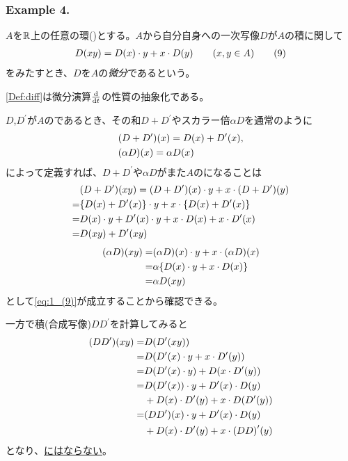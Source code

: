 \documentclass[../main]{subfiles}
\begin{document}
\subsubsection*{Example 4.}
\begin{definition}[微分]\label{Def:diff}
  $A$を$\mathbb{R}$上の任意の環({})とする。$A$から自分自身への一次写像$D$が$A$の積に関して
  \begin{align*}
    D(xy)=D(x)\cdot y+x\cdot D(y)\qq{}(x,y\in A)
    \tag{9}\label{eq:1_(9)}
  \end{align*}
  をみたすとき、$D$を$A$の\emph{微分}であるという。
\end{definition}

\begin{remark}
  \cref{Def:diff}は微分演算$\dv{t}$の性質の抽象化である。
\end{remark}

\begin{remark}
  $D$,$D^\prime$が$A$の{}であるとき、その和$D+D^\prime$やスカラー倍$\alpha D$を通常のように
  \begin{align*}
    &\qty(D+D^\prime)(x) = D(x)+D^\prime(x),\\
    &\qty(\alpha D)(x)=\alpha D(x)
  \end{align*}
  によって定義すれば、$D+D^\prime$や$\alpha D$がまた$A$の{}になることは
  \begin{align*}
    &(D+D^\prime)(xy)=(D+D^\prime)(x)\cdot y+x\cdot (D+D^\prime)(y)\\
    =&\qty{D(x)+D^\prime(x)}\cdot y+x\cdot\qty{D(x)+D^\prime(x)}\\
    =&D(x)\cdot y+D^\prime(x)\cdot y+x\cdot D(x)+x\cdot D^\prime(x)\\
    =&D(xy)+D^\prime(xy)
  \end{align*}
  \begin{align*}
    \qty(\alpha D)(xy) =& \qty(\alpha D)(x)\cdot y+x\cdot\qty(\alpha D)(x)\\
    =& \alpha \qty{D(x)\cdot y+x\cdot D(x)}\\
    =& \alpha D(xy)
  \end{align*}
  として\eqref{eq:1_(9)}が成立することから確認できる。

  一方で積(合成写像)$DD^\prime$を計算してみると
  \begin{align*}
    \qty(DD^\prime)(xy) =& D\qty(D^\prime(xy))\\
    =& D\qty(D^\prime(x)\cdot y+x\cdot D^\prime(y))\\
    =& D\qty(D^\prime(x)\cdot y) + D\qty(x\cdot D^\prime(y))\\
    =& D\qty(D^\prime(x))\cdot y + D^\prime(x)\cdot D(y)\\
    & +D(x)\cdot D^\prime(y)+ x\cdot D\qty(D^\prime(y))\\
    =& \qty(DD^\prime)(x)\cdot y + D^\prime(x)\cdot D(y)\\
    & +D(x)\cdot D^\prime(y)+ x\cdot \qty(DD)^\prime(y)
  \end{align*}
  となり、\underline{{}にはならない}。
\end{remark}
\end{document}
